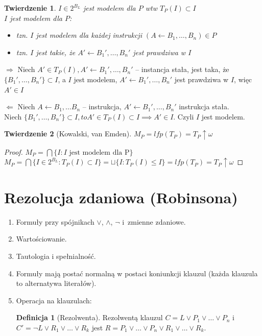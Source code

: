 \documentclass[10pt,a4paper]{article}
\theoremstyle{plain}
\newtheorem{theorem}{Twierdzenie}
\theoremstyle{definition}
\newtheorem*{definition}{Definicja}
\begin{document}
\begin{theorem}
$I\in 2^{B_L}$ jest modelem dla $P$ wtw $T_P(I) \subset I$\\
\textit{$I$ jest modelem dla $P$:}
\begin{itemize}
\item \textit{tzn. $I$ jest modelem dla każdej instrukcji $(A\leftarrow B_1, \ldots, B_n) \in P$}
\item \textit{tzn. $I$ jest takie, że $A' \leftarrow B_1', \ldots, B_n'$ jest prawdziwa w $I$ }
\end{itemize}
\end{theorem}

$\Rightarrow$ Niech $A' \in T_P(I), A' \leftarrow B_1', \ldots, B_n'$ -- instancja stała, jest taka, że $\{B_1', \ldots, B_n'\} \subset I$, a $I$ jest modelem, $A' \leftarrow B_1', \ldots, B_n'$  jest prawdziwa w $I$, więc $A' \in I$

$\Leftarrow$ Niech $A \leftarrow B_1, \ldots B_n$ -- instrukcja, $A' \leftarrow B_1', \ldots, B_n'$ instrukcja stała.\\
Niech $\{B_1', \ldots, B_n' \} \subset I, to {A'} \in T_P(I) \subset I \implies A'\in I$. Czyli $I$ jest modelem.

\begin{theorem}[Kowalski, van Emden]
$M_P = lfp(T_P) = T_P\uparrow\omega$
\end{theorem}

\begin{proof}
  $M_P = \bigcap \{ I : I \text{ jest modelem dla P}\}$\\
  $M_P = \bigcap \{ I \in 2^{B_L} : T_P(I) \subset I\} = \sqcup \{ I : T_P(I) \leq I\} = lfp(T_P) = T_P\uparrow\omega$
\end{proof}

\section{Rezolucja zdaniowa (Robinsona)}
\begin{enumerate}
\item Formuły przy spójnikach $\vee$, $\wedge$, $\neg$ i~zmienne zdaniowe.
\item Wartościowanie.
\item Tautologia i spełnialność.
\item Formuły mają postać normalną w postaci koniunkcji klauzul (każda klauzula
  to alternatywa literałów).
\item Operacja na klauzulach:
  \begin{definition}[Rezolwenta]
  Rezolwentą klauzul $C = L \vee P_1\vee \ldots \vee P_n$ i~
    $C' = \neg L \vee R_1\vee \ldots \vee R_k$ jest $R = P_1\vee \ldots
    \vee P_n \vee R_1\vee \ldots \vee R_k$.
  \end{definition}
\end{enumerate}
\end{document}
